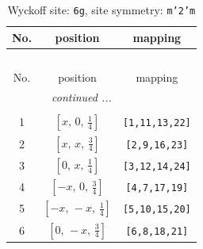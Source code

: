 \documentclass[fleqn,8pt]{jsarticle}
\begin{document}
\renewcommand{\arraystretch}{1.2}
\begin{longtable}{ccc}
\caption{Wyckoff site: {\tt 6g}, site symmetry: {\tt m'2'm}}
 \\
 \hline \hline
No. & position & mapping \\ \hline \endfirsthead

\multicolumn{2}{l}{\tablename\ \thetable{}} \\
 \hline \hline
No. & position & mapping \\ \hline \endhead

 \hline \hline
\multicolumn{2}{r}{\footnotesize\it continued ...} \\ \endfoot

 \hline \hline
\multicolumn{2}{r}{} \\ \endlastfoot

1 & $\left[ x,\, 0,\, \frac{1}{4} \right]$ & {\tt [1,11,13,22]} \\ \hline
2 & $\left[ x,\, x,\, \frac{3}{4} \right]$ & {\tt [2,9,16,23]} \\ \hline
3 & $\left[ 0,\, x,\, \frac{1}{4} \right]$ & {\tt [3,12,14,24]} \\ \hline
4 & $\left[ - x,\, 0,\, \frac{3}{4} \right]$ & {\tt [4,7,17,19]} \\ \hline
5 & $\left[ - x,\, - x,\, \frac{1}{4} \right]$ & {\tt [5,10,15,20]} \\ \hline
6 & $\left[ 0,\, - x,\, \frac{3}{4} \right]$ & {\tt [6,8,18,21]} \\
\end{longtable}
\renewcommand{\arraystretch}{1.2}
\end{document}
